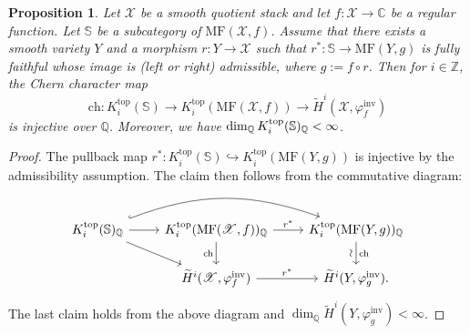 \documentclass [11pt,oneside,a4paper,mathscr]{amsart}
\newtheorem{prop}[thm]{Proposition}
\theoremstyle{definition}
\newcommand{\X}{\mathscr{X}}
\begin{document}
\begin{prop}\label{cherninj}
    Let $\X$ be a smooth quotient stack and let $f\colon \X\to\mathbb{C}$ be a regular function. Let $\mathbb{S}$ be a subcategory of $\mathrm{MF}(\X, f)$. Assume that there exists a smooth variety $Y$ and a morphism $r\colon Y\to\X$ such that $r^*\colon \mathbb{S}\to \mathrm{MF}(Y, g)$ is fully faithful whose image is (left or right) admissible, where $g:=f\circ r$.
    Then for $i \in \mathbb{Z}$, the Chern character map 
    \[\mathrm{ch}\colon K^{\mathrm{top}}_i(\mathbb{S})\to K^{\mathrm{top}}_i(\mathrm{MF}(\X, f))
    \to \widetilde{H}^i(\X, \varphi_f^{\mathrm{inv}})\] is injective over $\mathbb{Q}$. 
    Moreover, we have $\dim_{\mathbb{Q}} K_i^{\rm{top}}(\mathbb{S})_{\mathbb{Q}}<\infty$. 
\end{prop}

\begin{proof}
    The pullback map $r^*\colon K^{\mathrm{top}}_i(\mathbb{S})\hookrightarrow K^{\mathrm{top}}_i(\mathrm{MF}(Y, g))$ is injective
    by the admissibility 
    assumption. The claim then follows from the commutative diagram:
    \begin{equation*}
        \begin{tikzcd}
          K^{\mathrm{top}}_i(\mathbb{S})_{\mathbb{Q}}\arrow[r]\arrow[rr, hook, bend left=20]\arrow[dr]&  K^{\mathrm{top}}_i(\mathrm{MF}(\X, f))_{\mathbb{Q}}\arrow[d, "\mathrm{ch}"']\arrow[r, "r^*"]& K^{\mathrm{top}}_i(\mathrm{MF}(Y, g))_{\mathbb{Q}}\arrow[d, "\mathrm{ch}", "\sim" {anchor=south, rotate=90}]\\
            &\widetilde{H}^i(\X, \varphi^{\mathrm{inv}}_f)\arrow[r, "r^*"]& \widetilde{H}^i(Y, \varphi^{\mathrm{inv}}_g).
        \end{tikzcd}
    \end{equation*}
    The last claim holds from the above diagram and 
    $\dim_{\mathbb{Q}}\widetilde{H}^i(Y, \varphi^{\mathrm{inv}}_g)<\infty$.
\end{proof}
\end{document}
